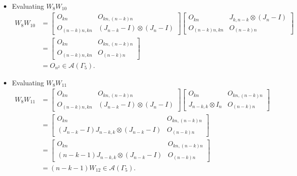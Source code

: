 \begin{itemize}
\item Evaluating $W_{8}W_{10}$
\begin{align*}
    W_8W_{10}
    &= \begin{bmatrix}
        O_{kn} & O_{kn, (n-k)n} \\
        O_{(n-k)n,kn} & (J_{n-k} - I) \otimes (J_n-I)
    \end{bmatrix}
    \begin{bmatrix}
        O_{kn} & J_{k,n-k} \otimes (J_n-I) \\
        O_{(n-k)n,kn} & O_{(n-k)n}
    \end{bmatrix}\\
    &= \begin{bmatrix}
        O_{kn} & O_{kn, (n-k)n} \\
        O_{(n-k)n,kn} & O_{(n - k)n}
    \end{bmatrix}\\
    &= O_{n^2} \in\mathcal{A}(\Gamma_5).
\end{align*}

\item Evaluating $W_{8}W_{11}$
\begin{align*}
    W_8W_{11}
    &= \begin{bmatrix}
        O_{kn} & O_{kn, (n-k)n} \\
        O_{(n-k)n,kn} & (J_{n-k} - I) \otimes (J_n-I)
    \end{bmatrix}
    \begin{bmatrix}
        O_{kn} & O_{kn, (n-k)n} \\
        J_{n-k, k}\otimes I_n & O_{(n-k)n}
    \end{bmatrix}\\
    &= \begin{bmatrix}
        O_{kn} & O_{kn, (n-k)n} \\
        (J_{n - k} - I)J_{n-k, k}\otimes (J_{n-k} - I) & O_{(n-k)n}
    \end{bmatrix}\\
    &= \begin{bmatrix}
        O_{kn} & O_{kn, (n-k)n} \\
        (n-k-1)J_{n-k, k}\otimes (J_{n-k} - I) & O_{(n-k)n}
    \end{bmatrix}\\
    &= (n-k-1)W_{12}\in\mathcal{A}(\Gamma_5).
\end{align*}


\end{itemize}
